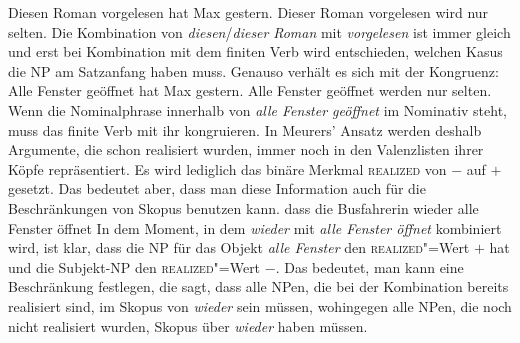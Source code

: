 \eal
\ex Diesen Roman vorgelesen hat Max gestern.
\ex Dieser Roman vorgelesen wird nur selten.
\zl
Die Kombination von \emph{diesen}/\emph{dieser} \emph{Roman} mit \emph{vorgelesen} ist immer gleich
  und erst bei Kombination mit dem finiten Verb wird entschieden, welchen Kasus die NP am Satzanfang
  haben muss. Genauso verhält es sich mit der Kongruenz:
\eal
\ex Alle Fenster geöffnet hat Max gestern.
\ex Alle Fenster geöffnet werden nur selten.
\zl
Wenn die Nominalphrase innerhalb von \emph{alle Fenster geöffnet} im Nominativ steht, muss das
finite Verb mit ihr kongruieren. In Meurers' Ansatz werden deshalb Argumente, die schon realisiert
wurden, immer noch in den Valenzlisten ihrer Köpfe repräsentiert. Es wird lediglich das binäre
Merkmal \textsc{realized} von $-$ auf $+$ gesetzt. Das bedeutet aber, dass man diese Information
auch für die Beschränkungen von Skopus benutzen kann.
\ea
dass die Busfahrerin wieder alle Fenster öffnet
\z
In dem Moment, in dem \emph{wieder} mit \emph{alle Fenster öffnet} kombiniert wird, ist klar, dass
die NP für das Objekt \emph{alle Fenster} den \textsc{realized}"=Wert $+$ hat und die Subjekt-NP
den \textsc{realized}"=Wert $-$. Das bedeutet, man kann eine Beschränkung festlegen, die sagt, dass
alle NPen, die bei der Kombination bereits realisiert sind, im Skopus von \emph{wieder} sein müssen,
wohingegen alle NPen, die noch nicht realisiert wurden, Skopus über \emph{wieder} haben müssen.

